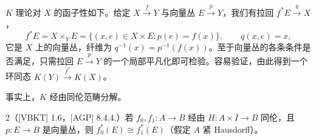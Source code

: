 
$K$ 理论对 $X$ 的函子性如下。给定 $X\xrightarrow{f}Y$ 与向量丛 $E\xrightarrow{p}Y$，我们有拉回 $f^*E\xrightarrow{q}X$，
\[
f^*E=X\times_Y E=\{(x,e)\in X\times E: p(e)=f(x)\},\qquad q(x,e)=x,
\]
它是 $X$ 上的向量丛，纤维为 $q^{-1}(x)=p^{-1}(f(x))$。至于向量丛的各条条件是否满足，只需拉回 $E\xrightarrow{p}Y$ 的一个局部平凡化即可检验。容易验证，由此得到一个环同态 $K(Y)\xrightarrow{f^*}K(X)$。

事实上，$K$ 经由同伦范畴分解。


\begin{prop}{2}（[VBKT] 1.6，[AGP] 8.4.4.）若 $f_0,f_1:A\to B$ 经由 $H:A\times I\to B$ 同伦，且 $p:E\to B$ 是向量丛，则 $f_0^*(E)\cong f_1^*(E)$（假定 $A$ 紧 Hausdorff）。
\end{prop}

